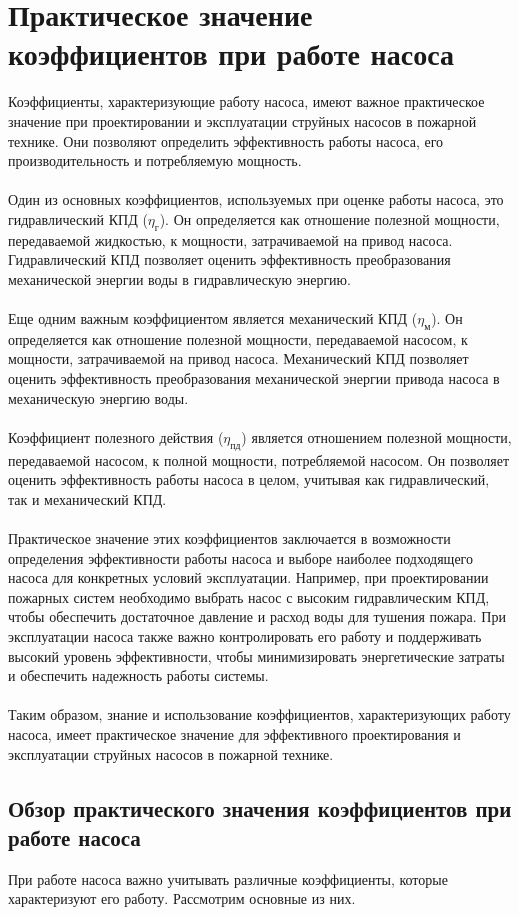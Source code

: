\documentclass{article}
\begin{document}
\section{Практическое значение коэффициентов при работе насоса}
Коэффициенты, характеризующие работу насоса, имеют важное практическое значение при проектировании и эксплуатации струйных насосов в пожарной технике. Они позволяют определить эффективность работы насоса, его производительность и потребляемую мощность.\\
~\\
Один из основных коэффициентов, используемых при оценке работы насоса, это гидравлический КПД ($\eta_{\text{г}}$). Он определяется как отношение полезной мощности, передаваемой жидкостью, к мощности, затрачиваемой на привод насоса. Гидравлический КПД позволяет оценить эффективность преобразования механической энергии воды в гидравлическую энергию.\\
~\\
Еще одним важным коэффициентом является механический КПД ($\eta_{\text{м}}$). Он определяется как отношение полезной мощности, передаваемой насосом, к мощности, затрачиваемой на привод насоса. Механический КПД позволяет оценить эффективность преобразования механической энергии привода насоса в механическую энергию воды.\\
~\\
Коэффициент полезного действия ($\eta_{\text{пд}}$) является отношением полезной мощности, передаваемой насосом, к полной мощности, потребляемой насосом. Он позволяет оценить эффективность работы насоса в целом, учитывая как гидравлический, так и механический КПД.\\
~\\
Практическое значение этих коэффициентов заключается в возможности определения эффективности работы насоса и выборе наиболее подходящего насоса для конкретных условий эксплуатации. Например, при проектировании пожарных систем необходимо выбрать насос с высоким гидравлическим КПД, чтобы обеспечить достаточное давление и расход воды для тушения пожара. При эксплуатации насоса также важно контролировать его работу и поддерживать высокий уровень эффективности, чтобы минимизировать энергетические затраты и обеспечить надежность работы системы.\\
~\\
Таким образом, знание и использование коэффициентов, характеризующих работу насоса, имеет практическое значение для эффективного проектирования и эксплуатации струйных насосов в пожарной технике.
\subsection{Обзор практического значения коэффициентов при работе насоса}
При работе насоса важно учитывать различные коэффициенты, которые характеризуют его работу. Рассмотрим основные из них.
\end{document}
